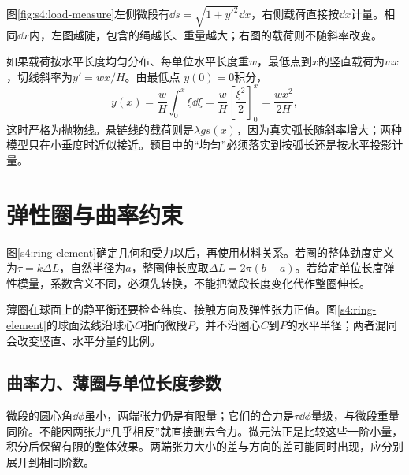 图\ref{fig:s4:load-measure}左侧微段有$\dd s=\sqrt{1+y'^2}\dd x$，右侧载荷直接按$\dd x$计量。相同$\dd x$内，左图越陡，包含的绳越长、重量越大；右图的载荷则不随斜率改变。


如果载荷按水平长度均匀分布、每单位水平长度重$w$，最低点到$x$的竖直载荷为$wx$，切线斜率为$y'=wx/H$。由最低点 $y(0)=0$积分，
\[y(x)=\frac wH\int_0^x\xi\dd\xi
 =\frac wH\left[\frac{\xi^2}{2}\right]_0^x=\frac{wx^2}{2H},\]
这时严格为抛物线。悬链线的载荷则是$\lambda gs(x)$，因为真实弧长随斜率增大；两种模型只在小垂度时近似接近。题目中的“均匀”必须落实到按弧长还是按水平投影计量。

\section{弹性圈与曲率约束}

图\ref{s4:ring-element}确定几何和受力以后，再使用材料关系。若圈的整体劲度定义为$\tau=k\Delta L$，自然半径为$a$，整圈伸长应取$\Delta L=2\pi(b-a)$。若给定单位长度弹性模量，系数含义不同，必须先转换，不能把微段长度变化代作整圈伸长。

薄圈在球面上的静平衡还要检查纬度、接触方向及弹性张力正值。图\ref{s4:ring-element}的球面法线沿球心$O$指向微段$P$，并不沿圈心$C$到$P$的水平半径；两者混同会改变竖直、水平分量的比例。

\subsection{曲率力、薄圈与单位长度参数}
微段的圆心角$\dd\phi$虽小，两端张力仍是有限量；它们的合力是$\tau\dd\phi$量级，与微段重量同阶。不能因两张力“几乎相反”就直接删去合力。微元法正是比较这些一阶小量，积分后保留有限的整体效果。两端张力大小的差与方向的差可能同时出现，应分别展开到相同阶数。

